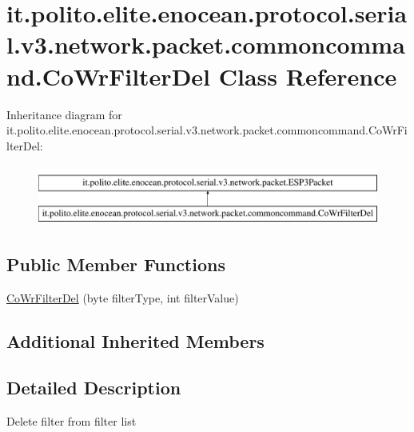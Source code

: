 \hypertarget{classit_1_1polito_1_1elite_1_1enocean_1_1protocol_1_1serial_1_1v3_1_1network_1_1packet_1_1commoncommand_1_1_co_wr_filter_del}{}\section{it.\+polito.\+elite.\+enocean.\+protocol.\+serial.\+v3.\+network.\+packet.\+commoncommand.\+Co\+Wr\+Filter\+Del Class Reference}
\label{classit_1_1polito_1_1elite_1_1enocean_1_1protocol_1_1serial_1_1v3_1_1network_1_1packet_1_1commoncommand_1_1_co_wr_filter_del}
Inheritance diagram for it.\+polito.\+elite.\+enocean.\+protocol.\+serial.\+v3.\+network.\+packet.\+commoncommand.\+Co\+Wr\+Filter\+Del\+:\begin{figure}[H]
\begin{center}
\leavevmode
\includegraphics[height=2.000000cm]{classit_1_1polito_1_1elite_1_1enocean_1_1protocol_1_1serial_1_1v3_1_1network_1_1packet_1_1commoncommand_1_1_co_wr_filter_del}
\end{center}
\end{figure}
\subsection*{Public Member Functions}
\begin{DoxyCompactItemize}
\item 
\hyperlink{classit_1_1polito_1_1elite_1_1enocean_1_1protocol_1_1serial_1_1v3_1_1network_1_1packet_1_1commoncommand_1_1_co_wr_filter_del_af9d4bde2c1965b4001f9b758cc665a56}{Co\+Wr\+Filter\+Del} (byte filter\+Type, int filter\+Value)
\end{DoxyCompactItemize}
\subsection*{Additional Inherited Members}


\subsection{Detailed Description}
Delete filter from filter list

